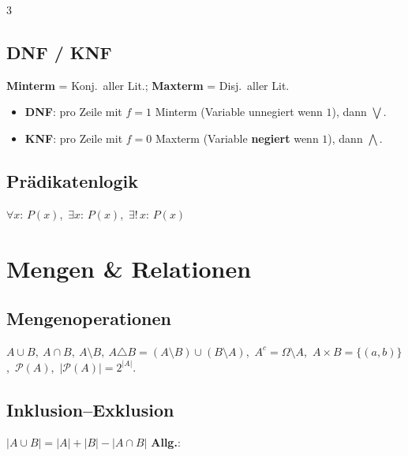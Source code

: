 \documentclass[8pt,a4paper]{extarticle}
\begin{document}
\begin{multicols*}{3}
\subsection{DNF / KNF}
\textbf{Minterm} = Konj.\ aller Lit.; \textbf{Maxterm} = Disj.\ aller Lit.
\begin{itemize}
\item \textbf{DNF}: pro Zeile mit $f{=}1$ Minterm (Variable unnegiert wenn $1$), dann $\bigvee$.
\item \textbf{KNF}: pro Zeile mit $f{=}0$ Maxterm (Variable \textbf{negiert} wenn $1$), dann $\bigwedge$.
\end{itemize}

\subsection{Pr\"adikatenlogik}
$\forall x{:}\,P(x)$,\ $\exists x{:}\,P(x)$,\ $\exists!\,x{:}\,P(x)$

\section{Mengen \& Relationen}
\subsection{Mengenoperationen}
$A\cup B,\ A\cap B,\ A\setminus B,\ A\triangle B=(A\setminus B)\cup(B\setminus A)$,\ $A^c=\Omega\setminus A$,\ $A\times B=\{(a,b)\}$,\ $\mathcal{P}(A)$,\ $|\mathcal{P}(A)|=2^{|A|}$.

\subsection{Inklusion--Exklusion}
$|A\cup B|=|A|+|B|-|A\cap B|$
\textbf{Allg.}:


\end{multicols*}
\end{document}
